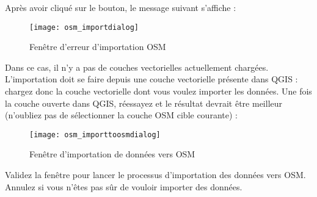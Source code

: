 Après avoir cliqué sur le bouton, le message suivant s'affiche :

\begin{figure}[ht]
   \centering
   \texttt{[image: osm\_importdialog]}   
   \caption{Fenêtre d'erreur d'importation OSM \nixcaption}\label{fig:osmimportmessage}
\end{figure}

Dans ce cas, il n'y a pas de couches vectorielles actuellement chargées. L'importation doit se faire depuis une couche vectorielle présente dans QGIS : chargez donc la couche vectorielle dont vous voulez importer les données. Une fois la couche ouverte dans QGIS, réessayez et le résultat devrait être meilleur (n'oubliez pas de sélectionner la couche OSM cible courante) :

\begin{figure}[ht]
   \centering
   \texttt{[image: osm\_importtoosmdialog]}   
   \caption{Fenêtre d'importation de données vers OSM \nixcaption}\label{fig:osmimporttoosm}
\end{figure}

Validez la fenêtre pour lancer le processus d'importation des données vers OSM. Annulez si vous n'êtes pas sûr de vouloir importer des données.

\FloatBarrier
